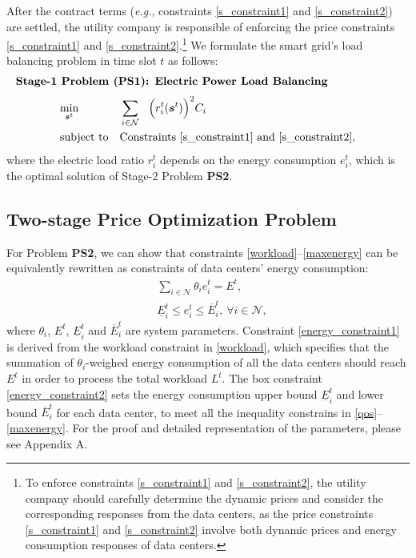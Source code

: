 \documentclass[journal]{IEEEtran}
\begin{document}
	After the contract terms (\emph{e.g.}, constraints \eqref{s_constraint1} and \eqref{s_constraint2}) are settled, the utility company is responsible of enforcing the price constraints \eqref{s_constraint1} and \eqref{s_constraint2}.\footnote{To enforce constraints \eqref{s_constraint1} and \eqref{s_constraint2}, the utility company should carefully determine the dynamic prices and consider the corresponding responses from the data centers, as the price constraints \eqref{s_constraint1} and \eqref{s_constraint2} involve both dynamic prices and energy consumption responses of data centers.} We formulate the smart grid's load balancing problem in time slot $t$ as follows:
	\begin{align*}
		\leftline{\textbf{Stage-1 Problem (PS1): Electric Power Load Balancing}}
	\end{align*}
	\begin{equation*}
		\begin{aligned}
			& \underset{\boldsymbol{s}^{t}} {\min}
			& & \sum_{i \in \mathcal{N}}~~ \Big( r_{i}^{t}(\boldsymbol{s}^{t}) \Big) ^{2} C_{i} \\
			& \text{subject to}
			& & \text{Constraints \eqref{s_constraint1} and \eqref{s_constraint2}},
		\end{aligned}
	\end{equation*}
	where the electric load ratio $r_{i}^{t}$ depends on the energy consumption $e_{i}^{t}$, which is the optimal solution of Stage-2 Problem \textbf{PS2}.
	
	\subsection{Two-stage Price Optimization Problem}
	For Problem \textbf{PS2}, we can show that constraints \eqref{workload}--\eqref{maxenergy} can be equivalently rewritten as constraints of data centers' energy consumption:
	\begin{align}
	& \sum_{i \in \mathcal{N}} \theta_i e_{i}^{t} = E^{t}, \label{energy_constraint1} \\
	& \underline{E}_{i}^{t} \leq e_{i}^{t} \leq \overline{E}_{i}^{t},~\forall i\in\mathcal{N}  \label{energy_constraint2},
	\end{align}
	where $\theta_i$, $E^{t}$, $\underline{E}_{i}^{t}$ and $\overline{E}_{i}^{t}$ are system parameters. Constraint \eqref{energy_constraint1} is derived from the workload constraint in \eqref{workload}, which specifies that the summation of $\theta_i$-weighed energy consumption of all the data centers should reach $E^{t}$ in order to process the total workload $L^{t}$. The box constraint \eqref{energy_constraint2} sets the energy consumption upper bound $\underline{E}_{i}^{t}$ and lower bound $\overline{E}_{i}^{t}$ for each data center, to meet all the inequality constrains in \eqref{qos}--\eqref{maxenergy}. For the proof and detailed representation of the parameters, please see Appendix A.
	
\end{document}
